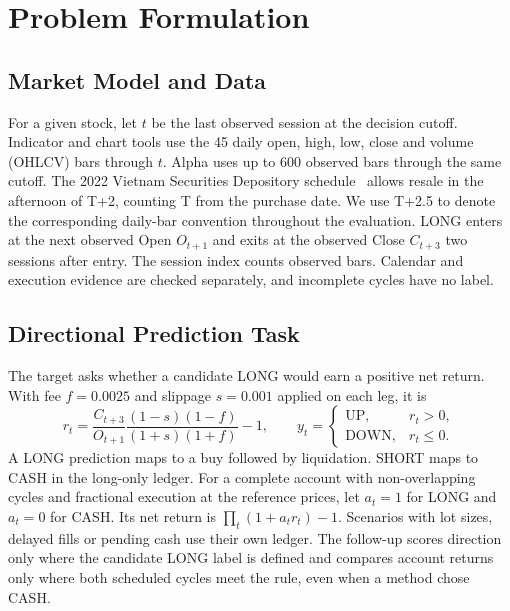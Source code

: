 \section{Problem Formulation}
\label{sec:formulation}

\subsection{Market Model and Data}
For a given stock, let \(t\) be the last observed session at the decision
cutoff. Indicator and chart tools use the 45 daily open, high, low, close and
volume (OHLCV) bars through \(t\). Alpha uses up to 600 observed bars through
the same cutoff. The 2022 Vietnam Securities Depository schedule~\cite{vsd2022settlement}
allows resale in the afternoon of T+2, counting T from the purchase date.
We use T+2.5 to denote the corresponding daily-bar convention
throughout the evaluation. LONG enters at the next observed Open
\(O_{t+1}\) and exits at the observed Close \(C_{t+3}\) two sessions after
entry. The session index counts observed bars. Calendar and execution
evidence are checked separately, and incomplete cycles have no label.

\subsection{Directional Prediction Task}
The target asks whether a candidate LONG would earn a positive net return.
With fee \(f=0.0025\) and slippage \(s=0.001\) applied on each leg, it is
\begin{equation}
  r_t = \frac{C_{t+3}}{O_{t+1}}
        \frac{(1-s)(1-f)}{(1+s)(1+f)}-1,
  \qquad
  y_t =
  \begin{cases}
    \mathrm{UP},   & r_t>0,\\
    \mathrm{DOWN}, & r_t\leq 0 .
  \end{cases}
  \label{eq:label}
\end{equation}
A LONG prediction maps to a buy followed by liquidation. SHORT maps to
CASH in the long-only ledger. For a complete account with non-overlapping
cycles and fractional execution at the reference prices, let \(a_t=1\)
for LONG and \(a_t=0\) for CASH. Its net return is
\(\prod_t(1+a_t r_t)-1\). Scenarios with lot sizes, delayed fills or pending
cash use their own ledger. The follow-up scores direction only where the
candidate LONG label is defined and compares account returns only where both
scheduled cycles meet the rule, even when a method chose CASH.

